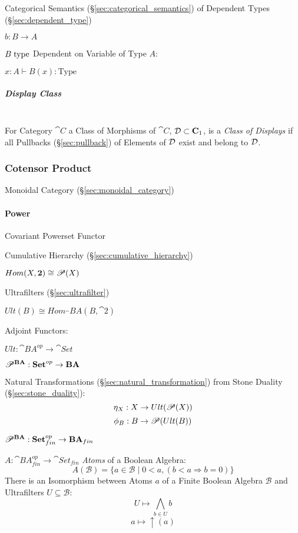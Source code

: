 Categorical Semantics (\S\ref{sec:categorical_semantics}) of Dependent
Types (\S\ref{sec:dependent_type})

$b : B \rightarrow A$

$B \mathrm{\;type}$ Dependent on Variable of Type $A$:

$x:A \vdash B(x):\mathrm{Type}$



\subparagraph{Display Class}\label{sec:display_class}
\hfill \\

For Category $\cat{C}$ a Class of Morphisms of $\cat{C}$, $\mathcal{D}
\subset \mathbf{C}_1$, is a \emph{Class of Displays} if all Pullbacks
(\S\ref{sec:pullback}) of Elements of $\mathcal{D}$ exist and belong to
$\mathcal{D}$.



\subsubsection{Cotensor Product}\label{sec:cotensor_product}

Monoidal Category (\S\ref{sec:monoidal_category})



\paragraph{Power}\label{sec:power}

Covariant Powerset Functor %

Cumulative Hierarchy (\S\ref{sec:cumulative_hierarchy})

$Hom(X,\mathbf{2}) \cong \mathscr{P}(X)$

Ultrafilters (\S\ref{sec:ultrafilter})

$Ult(B) \cong Hom_\cat{BA}(B,\cat{2})$

Adjoint Functors:

$Ult : \cat{BA}^{op} \rightarrow \cat{Set}$

$\mathscr{P}^\mathbf{BA} : \mathbf{Set}^{op} \rightarrow \mathbf{BA}$

Natural Transformations (\S\ref{sec:natural_transformation}) from
Stone Duality (\S\ref{sec:stone_duality}):
\[
  \eta_X : X \rightarrow Ult(\mathscr{P}(X))
\]\[
  \phi_B : B \rightarrow \mathscr{P}(Ult(B))
\]

$\mathscr{P}^\mathbf{BA} :
  \mathbf{Set}^{op}_{fin} \rightarrow \mathbf{BA}_{fin}$

$A : \cat{BA}^{op}_{fin} \rightarrow \cat{Set}_{fin}$
\emph{Atoms} of a Boolean Algebra:
\[
  A(\mathcal{B}) = \{ a \in \mathcal{B} \;|\;
    0 < a, (b < a \Rightarrow b = 0) \}
\]
There is an Isomorphism between Atoms $a$ of a Finite Boolean Algebra
$\mathcal{B}$ and Ultrafilters $U \subseteq \mathcal{B}$:
\[
  U \mapsto \bigwedge_{b \in U} b
\]\[
  a \mapsto \uparrow (a)
\]



